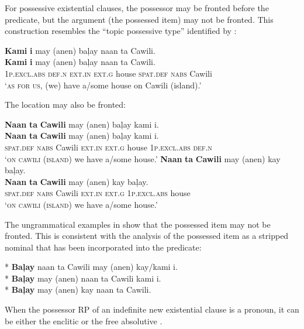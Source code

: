 For possessive existential clauses, the possessor may be fronted before the predicate, but the argument (the possessed item) may not be fronted. This construction resembles the “topic possessive type” identified by \citet[58]{stassen2009}:
 
\ea
\textbf{Kami}  \textbf{i}  may  (anen)  baļay  naan  ta  Cawili. \\\smallskip \gll \textbf{Kami}  \textbf{i}  may  (anen)  baļay  naan  ta  Cawili. \\
1\textsc{p.excl.abs}  \textsc{def.n}  \textsc{ext.in}  \textsc{ext.g}   house  \textsc{spat.def}  \textsc{nabs}  Cawili \\
\glt ‘\textsc{as for us}, (we) have a/some house on Cawili (island).’
\z

The location may also be fronted:
 
\ea
    \ea
    \textbf{Naan}  \textbf{ta}  \textbf{Cawili}  may  (anen)  baļay  kami  i. \\\smallskip
\gll \textbf{Naan}  \textbf{ta}  \textbf{Cawili}  may  (anen)  baļay  kami  i. \\
    \textsc{spat.def}  \textsc{nabs}  Cawili  \textsc{ext.in}  \textsc{ext.g}   house  1\textsc{p.excl.abs}  \textsc{def.n} \\
    \glt ‘\textsc{on cawili (island)} we have a/some house.’
    \ex
    \textbf{Naan}  \textbf{ta}  \textbf{Cawili}  may  (anen)  kay  baļay. \\\smallskip
\gll \textbf{Naan}  \textbf{ta}  \textbf{Cawili}  may  (anen)  kay  baļay. \\
    \textsc{spat.def}  \textsc{nabs}  Cawili  \textsc{ext.in}  \textsc{ext.g}   1\textsc{p.excl.abs}   house \\
     \glt ‘\textsc{on cawili (island)} we have a/some house.’
    \z
\z

The ungrammatical examples in  show that the possessed item may not be fronted. This is consistent with the analysis of the possessed item as a stripped nominal that has been incorporated into the predicate:

\ea
    \label{bkm:Ref143335735}
    \ea
    *{ }\textbf{Baļay} naan ta Cawili may (anen) kay/kami i. \\
    \ex
    *{ }\textbf{Baļay} may (anen) naan ta Cawili kami i. \\
    \ex
    *{ }\textbf{Baļay} may (anen) kay naan ta Cawili.
    \z
\z

When the possessor RP of an indefinite new existential clause is a pronoun, it can be either the enclitic  or the free absolutive . 
 
